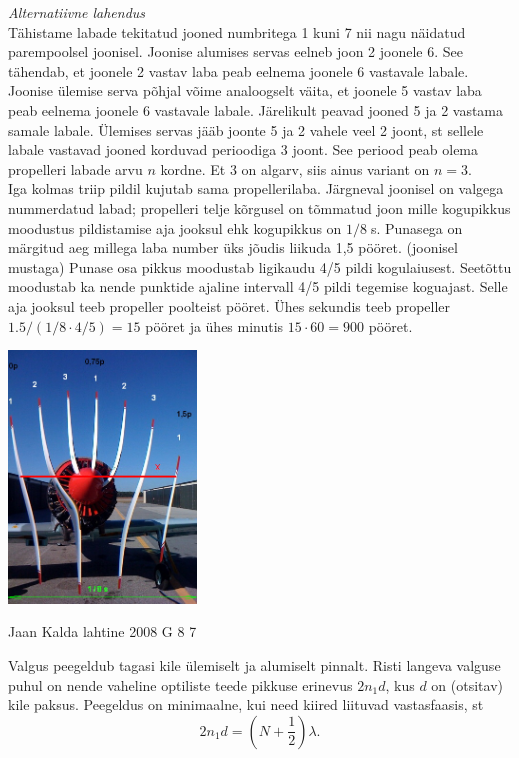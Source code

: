 \documentclass[11pt]{article}
\begin{document}
{{\textit{Alternatiivne lahendus} \\
Tähistame labade tekitatud jooned numbritega 1 kuni 7 nii nagu näidatud parempoolsel joonisel.
Joonise alumises servas eelneb joon 2 joonele 6.
See tähendab, et joonele 2 vastav laba peab eelnema joonele 6 vastavale labale.
Joonise ülemise serva põhjal võime analoogselt väita, et joonele 5 vastav laba peab eelnema joonele 6 vastavale labale.
Järelikult peavad jooned 5 ja 2 vastama samale labale. Ülemises servas jääb joonte 5 ja 2 vahele veel 2
joont, st sellele labale vastavad jooned korduvad perioodiga 3 joont.
See periood peab olema propelleri labade arvu $n$ kordne. Et 3 on algarv, siis ainus variant on $n=3$.\\
\osa Iga kolmas triip pildil kujutab sama propellerilaba. Järgneval joonisel on valgega nummerdatud labad;
propelleri telje kõrgusel on tõmmatud joon mille kogupikkus moodustus pildistamise aja jooksul ehk kogupikkus on $1/8\;$s.
Punasega on märgitud aeg millega laba number üks jõudis liikuda 1,5 pööret. (joonisel mustaga)
Punase osa pikkus moodustab ligikaudu 4/5 pildi kogulaiusest. Seetõttu moodustab ka nende punktide ajaline intervall 4/5 pildi tegemise koguajast. Selle aja jooksul teeb propeller poolteist pööret. Ühes sekundis teeb propeller $\num{1,5} /(1/8\cdot 4/5)=15$ pööret ja ühes minutis $15\cdot 60=900$ pööret.

\begin{center}
	\includegraphics[width=50mm]{2010-v3g-10-Propeller3.jpg}
\end{center}
\fi
}

{Jaan Kalda} %
{lahtine} %
{2008} %
{G 8} %
{7} %
{

\ifSolution
Valgus peegeldub tagasi kile ülemiselt ja alumiselt pinnalt. Risti langeva valguse puhul on nende vaheline optiliste teede pikkuse erinevus $2n_1d$, kus $d$ on (otsitav) kile paksus. Peegeldus on minimaalne, kui need kiired liituvad vastasfaasis, st
\[
2n_1d = \left( N + \frac 12 \right)\lambda.
\]

}}
\end{document}
